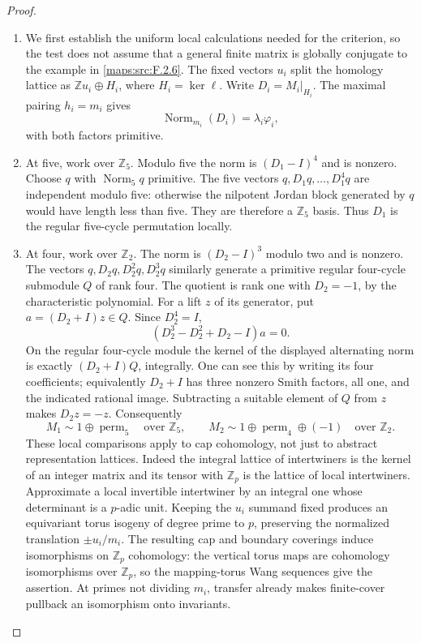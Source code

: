 \begin{proof}
\begin{enumerate}[label=\arabic*.]
\item We first establish the uniform local calculations needed
for the criterion, so the test does not assume that a
general finite matrix is globally conjugate to the example
in \ref{maps:src:F.2.6}.
The fixed vectors $u_i$ split the homology lattice as
$\mathbb Zu_i\oplus H_i$, where $H_i=\ker\ell$.
Write $D_i=M_i|_{H_i}$.
The maximal pairing $h_i=m_i$ gives
\[
 \operatorname{Norm}_{m_i}(D_i)=\lambda_i\varphi_i ,
 \tag{F.HC4}\label{maps:eq:F.HC4}
\]
with both factors primitive.

\item At five, work over $\mathbb Z_5$.
Modulo five the norm is $(D_1-I)^4$ and is nonzero.
Choose $q$ with $\operatorname{Norm}_5q$ primitive.
The five vectors $q,D_1q,\ldots,D_1^4q$ are independent
modulo five: otherwise the nilpotent Jordan block generated
by $q$ would have length less than five.
They are therefore a $\mathbb Z_5$ basis.
Thus $D_1$ is the regular five-cycle permutation locally.

\item At four, work over $\mathbb Z_2$.
The norm is $(D_2-I)^3$ modulo two and is nonzero.
The vectors $q,D_2q,D_2^2q,D_2^3q$ similarly generate
a primitive regular four-cycle submodule $Q$ of rank four.
The quotient is rank one with $D_2=-1$, by the
characteristic polynomial.
For a lift $z$ of its generator, put $a=(D_2+I)z\in Q$.
Since $D_2^4=I$,
\[
 (D_2^3-D_2^2+D_2-I)a=0.
\]
On the regular four-cycle module the kernel of the
displayed alternating norm is exactly $(D_2+I)Q$,
integrally.  One can see this by writing its four
coefficients; equivalently $D_2+I$ has three nonzero
Smith factors, all one, and the indicated rational image.
Subtracting a suitable element of $Q$ from $z$ makes
$D_2z=-z$.
Consequently
\[
 M_1\sim 1\oplus\operatorname{perm}_5\quad\text{over }\mathbb Z_5,
 \qquad
 M_2\sim1\oplus\operatorname{perm}_4\oplus(-1)
 \quad\text{over }\mathbb Z_2 .
 \tag{F.HC5}\label{maps:eq:F.HC5}
\]
These local comparisons apply to cap cohomology, not just
to abstract representation lattices.
Indeed the integral lattice of intertwiners is the kernel
of an integer matrix and its tensor with $\mathbb Z_p$
is the lattice of local intertwiners.
Approximate a local invertible intertwiner by an integral
one whose determinant is a $p$-adic unit.
Keeping the $u_i$ summand fixed produces an equivariant
torus isogeny of degree prime to $p$, preserving the
normalized translation $\pm u_i/m_i$.
The resulting cap and boundary coverings induce
isomorphisms on $\mathbb Z_p$ cohomology: the vertical
torus maps are cohomology isomorphisms over $\mathbb Z_p$,
so the mapping-torus Wang sequences give the assertion.
At primes not dividing $m_i$, transfer already makes
finite-cover pullback an isomorphism onto invariants.


\end{enumerate}
\end{proof}
